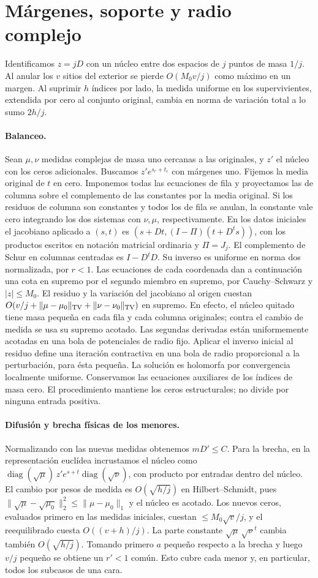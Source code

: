 \section{Márgenes, soporte y radio complejo}
Identificamos $z=jD$ con un núcleo entre dos espacios de $j$ puntos de masa $1/j$.
Al anular los $v$ sitios del exterior se pierde $O(M_0v/j)$ como máximo en un margen.
Al suprimir $h$ índices por lado, la medida uniforme en los supervivientes, extendida
por cero al conjunto original, cambia en norma de variación total a lo sumo $2h/j$.
\paragraph{Balanceo.}
Sean $\mu,\nu$ medidas complejas de masa uno cercanas a las originales, y $z'$ el
núcleo con los ceros adicionales. Buscamos $z'e^{s_r+t_c}$ con márgenes uno.
Fijemos la media original de $t$ en cero. Imponemos todas las ecuaciones de fila y
proyectamos las de columna sobre el complemento de las constantes por la media original.
Si los residuos de columna son constantes y todos los de fila se anulan, la constante
vale cero integrando los dos sistemas con $\nu,\mu$, respectivamente.
En los datos iniciales el jacobiano aplicado a $(s,t)$ es $(s+Dt,(I-\Pi)(t+D^ts))$,
con los productos escritos en notación matricial ordinaria y $\Pi=J_j$.
El complemento de Schur en columnas centradas es $I-D^tD$. Su inverso es uniforme en
norma dos normalizada, por $r<1$. Las ecuaciones de cada coordenada dan a continuación
una cota en supremo por el segundo miembro en supremo, por Cauchy--Schwarz y $|z|\le M_0$.
El residuo y la variación del jacobiano al origen cuestan
$O(v/j+\|\mu-\mu_0\|_{\rm TV}+\|\nu-\nu_0\|_{\rm TV})$ en supremo.
En efecto, el núcleo quitado tiene masa pequeña en cada fila y cada columna originales;
contra el cambio de medida se usa su supremo acotado. Las segundas derivadas están
uniformemente acotadas en una bola de potenciales de radio fijo. Aplicar el inverso
inicial al residuo define una iteración contractiva en una bola de radio proporcional
a la perturbación, para ésta pequeña. La solución es holomorfa por convergencia
localmente uniforme. Conservamos las ecuaciones auxiliares de los índices de masa cero.
El procedimiento mantiene los ceros estructurales; no divide por ninguna entrada positiva.
\paragraph{Difusión y brecha físicas de los menores.}
Normalizando con las nuevas medidas obtenemos $mD'\le C$. Para la brecha, en la
representación euclídea incrustamos el núcleo como
$\operatorname{diag}(\sqrt\mu)\,z'e^{s+t}\operatorname{diag}(\sqrt\nu)$,
con producto por entradas dentro del núcleo. El cambio por pesos de medida es
$O(\sqrt{h/j})$ en Hilbert--Schmidt, pues
$\|\sqrt\mu-\sqrt{\mu_0}\|_2^2\le\|\mu-\mu_0\|_1$ y el núcleo es acotado.
Los nuevos ceros, evaluados primero en las medidas iniciales, cuestan
$\le M_0\sqrt v/j$, y el reequilibrado cuesta $O((v+h)/j)$.
La parte constante $\sqrt\mu\,\sqrt\nu^t$ cambia también $O(\sqrt{h/j})$.
Tomando primero $a$ pequeño respecto a la brecha y luego $v/j$ pequeño se obtiene
un $r'<1$ común. Esto cubre cada menor y, en particular, todos los subcasos de una cara.

